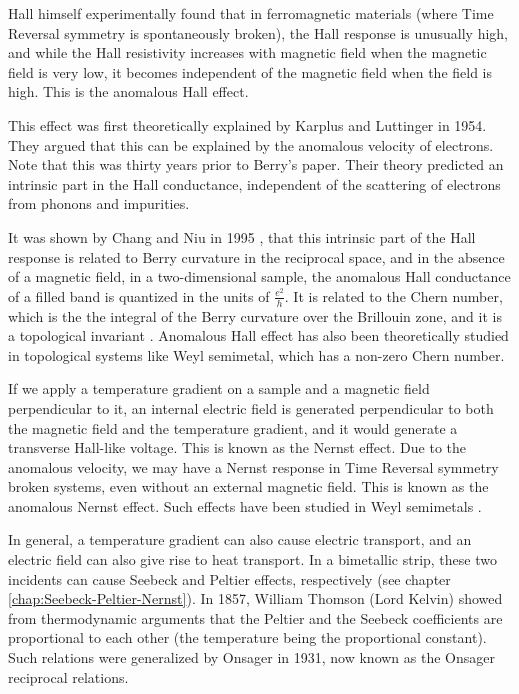\documentclass{report}
\begin{document}
Hall himself experimentally found that \cite{HallAnomalousOriginaldoi:10.1080/14786448108627086} in ferromagnetic materials (where Time Reversal symmetry is spontaneously broken), the Hall response is unusually high, and while the Hall resistivity increases with magnetic field when the magnetic field is very low, it becomes independent of the magnetic field when the field is high. This is the anomalous Hall effect.

This effect was first theoretically explained by Karplus and Luttinger \cite{KarplusLuttinger1954} in 1954. They argued that this can be explained by the anomalous velocity of electrons. Note that this was thirty years prior to Berry's paper. Their theory predicted an intrinsic part in the Hall conductance, independent of the scattering of electrons from phonons and impurities.

It was shown by Chang and Niu in 1995 \cite{chang1995}, that this intrinsic part of the Hall response is related to Berry curvature in the reciprocal space, and in the absence of a magnetic field, in a two-dimensional sample, the anomalous Hall conductance of a filled band is quantized in the units of $\frac{e^2}{h}$. It is related to the Chern number, which is the the integral of the Berry curvature over the Brillouin zone, and it is a topological invariant \cite{chang1996}.
Anomalous Hall effect has also been theoretically studied \cite{WeylAnomalousHall} in topological systems like Weyl semimetal, which has a non-zero Chern number.

If we apply a temperature gradient on a sample and a magnetic field perpendicular to it, an internal electric field is generated perpendicular to both the magnetic field and the temperature gradient, and it would generate a transverse Hall-like voltage. This is known as the Nernst effect. Due to the anomalous velocity, we may have a Nernst response in Time Reversal symmetry broken systems, even without an external magnetic field. This is known as the anomalous Nernst effect. Such effects have been studied in Weyl semimetals \cite{WeylAnomalousNernstYang, WeylAnomalousNernstSaha2018}.

In general, a temperature gradient can also cause electric transport, and an electric field can also give rise to heat transport. In a bimetallic strip, these two incidents can cause Seebeck and Peltier effects, respectively (see chapter \ref{chap:Seebeck-Peltier-Nernst}). In 1857,
William Thomson (Lord Kelvin) \cite{thomson_1857} showed from thermodynamic arguments that the Peltier and the Seebeck coefficients are proportional to each other (the temperature being the proportional constant). Such relations were generalized by Onsager \cite{OnsagerPhysRev.37.405} in 1931, now known as the Onsager reciprocal relations.
\end{document}
